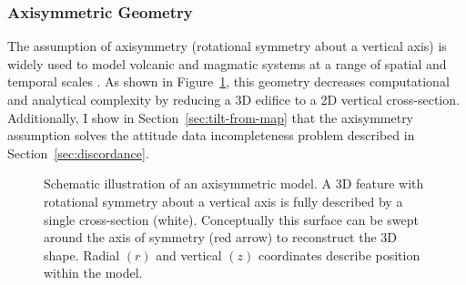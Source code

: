 \subsubsection{Axisymmetric Geometry}

The assumption of axisymmetry (rotational symmetry about a vertical axis) is widely used to model volcanic and magmatic systems at a range of spatial and temporal scales \parencite[c.f.,][]{redmond_numerical_2004,ogawa_four-stage_2021,mogi_relations_1958,mctigue_elastic_1987}. As shown in Figure~\ref{fig:axisymmetry}, this geometry decreases computational and analytical complexity by reducing a 3D edifice to a 2D vertical cross-section. Additionally, I show in Section~\ref{sec:tilt-from-map} that the axisymmetry assumption solves the attitude data incompleteness problem described in Section~\ref{sec:discordance}.

\begin{figure}
    \caption[Axisymmetry]{Schematic illustration of an axisymmetric model. A 3D feature with rotational symmetry about a vertical axis is fully described by a single cross-section (white). Conceptually this surface can be swept around the axis of symmetry (red arrow) to reconstruct the 3D shape. Radial $(r)$ and vertical $(z)$ coordinates describe position within the model.}%
    \label{fig:axisymmetry}
\end{figure}
